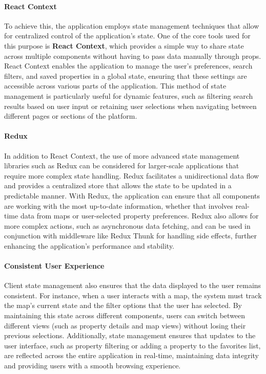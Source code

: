    \paragraph{React Context}
    To achieve this, the application employs state management techniques that allow for centralized control of the application’s state. One of the core tools used for this purpose is \textbf{React Context}, which provides a simple way to share state across multiple components without having to pass data manually through props. React Context enables the application to manage the user’s preferences, search filters, and saved properties in a global state, ensuring that these settings are accessible across various parts of the application. This method of state management is particularly useful for dynamic features, such as filtering search results based on user input or retaining user selections when navigating between different pages or sections of the platform.
    \newline
    \paragraph{Redux}
    In addition to React Context, the use of more advanced state management libraries such as Redux can be considered for larger-scale applications that require more complex state handling. Redux facilitates a unidirectional data flow and provides a centralized store that allows the state to be updated in a predictable manner. With Redux, the application can ensure that all components are working with the most up-to-date information, whether that involves real-time data from maps or user-selected property preferences. Redux also allows for more complex actions, such as asynchronous data fetching, and can be used in conjunction with middleware like Redux Thunk for handling side effects, further enhancing the application’s performance and stability.
    \newline
    \paragraph{Consistent User Experience}
    Client state management also ensures that the data displayed to the user remains consistent. For instance, when a user interacts with a map, the system must track the map's current state and the filter options that the user has selected. By maintaining this state across different components, users can switch between different views (such as property details and map views) without losing their previous selections. Additionally, state management ensures that updates to the user interface, such as property filtering or adding a property to the favorites list, are reflected across the entire application in real-time, maintaining data integrity and providing users with a smooth browsing experience.
    \newline
